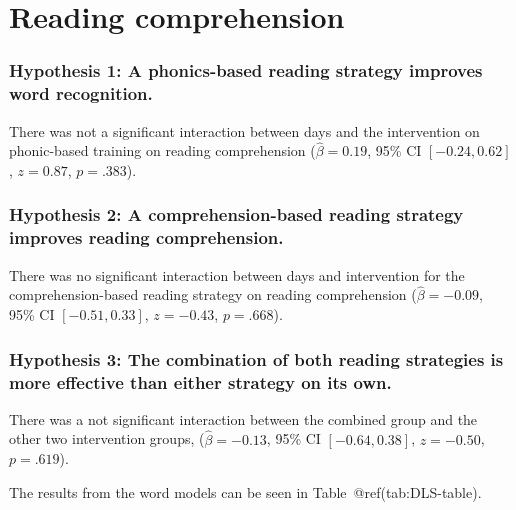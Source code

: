 \documentclass[
  ,
]{article}
\begin{document}
\hypertarget{reading-comprehension-1}{%
\section{Reading comprehension}\label{reading-comprehension-1}}

\hypertarget{hypothesis-1-a-phonics-based-reading-strategy-improves-word-recognition.-1}{%
\subsubsection{Hypothesis 1: A phonics-based reading strategy improves
word
recognition.}\label{hypothesis-1-a-phonics-based-reading-strategy-improves-word-recognition.-1}}

There was not a significant interaction between days and the
intervention on phonic-based training on reading comprehension
(\(\hat{\beta} = 0.19\), 95\% CI \([-0.24, 0.62]\), \(z = 0.87\),
\(p = .383\)).

\hypertarget{hypothesis-2-a-comprehension-based-reading-strategy-improves-reading-comprehension.}{%
\subsubsection{Hypothesis 2: A comprehension-based reading strategy
improves reading
comprehension.}\label{hypothesis-2-a-comprehension-based-reading-strategy-improves-reading-comprehension.}}

There was no significant interaction between days and intervention for
the comprehension-based reading strategy on reading comprehension
(\(\hat{\beta} = -0.09\), 95\% CI \([-0.51, 0.33]\), \(z = -0.43\),
\(p = .668\)).

\hypertarget{hypothesis-3-the-combination-of-both-reading-strategies-is-more-effective-than-either-strategy-on-its-own.-2}{%
\subsubsection{Hypothesis 3: The combination of both reading strategies
is more effective than either strategy on its
own.}\label{hypothesis-3-the-combination-of-both-reading-strategies-is-more-effective-than-either-strategy-on-its-own.-2}}

There was a not significant interaction between the combined group and
the other two intervention groups, (\(\hat{\beta} = -0.13\), 95\% CI
\([-0.64, 0.38]\), \(z = -0.50\), \(p = .619\)).

The results from the word models can be seen in
Table~@ref(tab:DLS-table).
\end{document}
